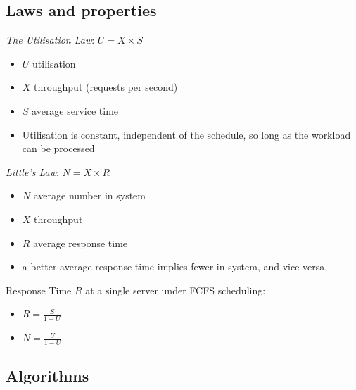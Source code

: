 \documentclass[11pt,a4paper]{article}
\begin{document}
\subsection{Laws and properties}

\emph{The Utilisation Law}: $U = X \times S$
\begin{itemize}
    \item $U$ utilisation
    \item $X$ throughput (requests per second)
    \item $S$ average service time
    \item Utilisation is constant, independent of the schedule, so long as the workload
        can be processed
\end{itemize}

\emph{Little's Law}: $N = X \times R$
\begin{itemize}
    \item $N$ average number in system
    \item $X$ throughput
    \item $R$ average response time
    \item a better average response time implies fewer in system, and vice versa.
\end{itemize}

Response Time $R$ at a single server under FCFS scheduling:
\begin{itemize}
    \item $R = \frac{S}{1-U}$
    \item $N = \frac{U}{1-U}$
\end{itemize}

\subsection{Algorithms}
\end{document}
